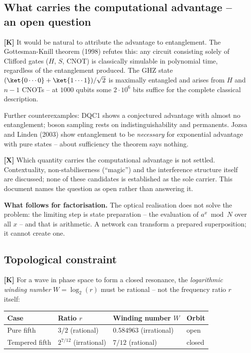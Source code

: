 \subsection{What carries the computational advantage -- an open question}

\textbf{[K]} It would be natural to attribute the advantage to entanglement.
The Gottesman-Knill theorem (1998) refutes this: any circuit consisting
solely of Clifford gates ($H$, $S$, CNOT) is classically simulable in
polynomial time, regardless of the entanglement produced. The GHZ state
$(\ket{0\cdots0} + \ket{1\cdots1})/\sqrt2$ is maximally entangled and arises
from $H$ and $n-1$ CNOTs -- at $1000$ qubits some $2\cdot10^{6}$ bits
suffice for the complete classical description.

Further counterexamples: DQC1 shows a conjectured advantage with almost no
entanglement; boson sampling rests on indistinguishability and permanents.
Jozsa and Linden (2003) show entanglement to be \emph{necessary} for
exponential advantage with pure states -- about sufficiency the theorem says
nothing.

\textbf{[X]} Which quantity carries the computational advantage is not
settled. Contextuality, non-stabiliserness (\enquote{magic}) and the
interference structure itself are discussed; none of these candidates is
established as the sole carrier. This document names the question as open
rather than answering it.

\textbf{What follows for factorisation.} The optical realisation does not
solve the problem: the limiting step is state preparation -- the evaluation
of $a^x \bmod N$ over all $x$ -- and that is arithmetic. A network can
transform a prepared superposition; it cannot create one.

\subsection{Topological constraint}

\textbf{[K]} For a wave in phase space to form a closed resonance, the
\emph{logarithmic winding number} $W = \log_2(r)$ must be rational -- not the
frequency ratio $r$ itself:

\begin{center}
\begin{tabular}{llll}
\toprule
Case & Ratio $r$ & Winding number $W$ & Orbit \\
\midrule
Pure fifth & $3/2$ (rational) & $0.584963$ (irrational) & open \\
Tempered fifth & $2^{7/12}$ (irrational) & $7/12$ (rational) & closed \\
\bottomrule
\end{tabular}
\end{center}

